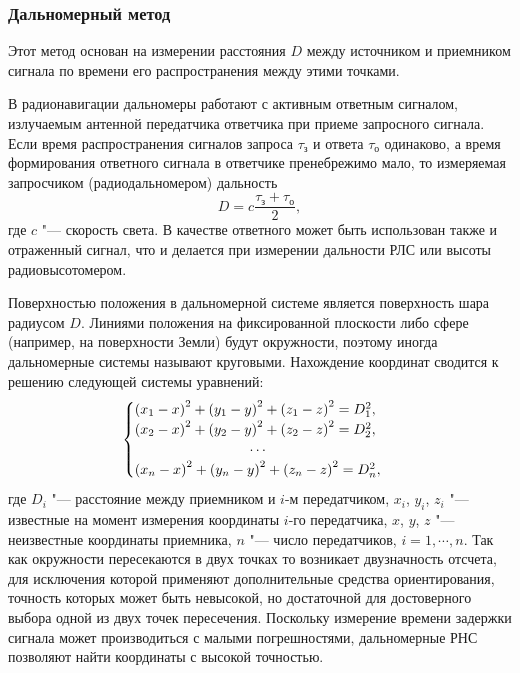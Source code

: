 \documentclass[../main.tex]{subfiles}
\begin{document}
\subsubsection{Дальномерный метод}
Этот метод основан на измерении расстояния $D$ между источником и приемником сигнала по времени его распространения между этими точками.

В радионавигации дальномеры работают с активным ответным сигналом, излучаемым антенной передатчика ответчика при приеме запросного сигнала. Если время распространения сигналов запроса $\tau_{\text{з}}$ и ответа $\tau_{\text{о}}$ одинаково, а время формирования ответного сигнала в ответчике пренебрежимо мало, то измеряемая запросчиком (радиодальномером) дальность
\begin{equation*}
    D = c \frac{\tau_{\text{з}} + \tau_{\text{о}}}{2},
\end{equation*}
где $c$ "--- скорость света. В качестве ответного может быть использован также и отраженный сигнал, что и делается при измерении дальности РЛС или высоты радиовысотомером.

Поверхностью положения в дальномерной системе является поверхность шара радиусом $D$. Линиями положения на фиксированной плоскости либо сфере (например, на поверхности Земли) будут окружности, поэтому иногда дальномерные системы называют круговыми. Нахождение координат сводится к решению следующей системы уравнений:
\begin{equation*}
    \begin{cases}
        \left(x_1 - x\right)^2 + \left(y_1 - y\right)^2 + \left(z_1 - z\right)^2 = D_1^2, \\
        \left(x_2 - x\right)^2 + \left(y_2 - y\right)^2 + \left(z_2 - z\right)^2 = D_2^2, \\
        \hfil \cdots \\
        \left(x_n - x\right)^2 + \left(y_n - y\right)^2 + \left(z_n - z\right)^2 = D_n^2, \\
    \end{cases}
\end{equation*}
где $D_i$ "--- расстояние между приемником и $i$-м передатчиком, $x_i$, $y_i$, $z_i$ "--- известные на момент измерения координаты $i$-го передатчика, $x$, $y$, $z$ "--- неизвестные координаты приемника, $n$ "--- число передатчиков, $i = 1,\cdots, n$. Так как окружности пересекаются в двух точках то возникает двузначность отсчета, для исключения которой применяют дополнительные средства ориентирования, точность которых может быть невысокой, но достаточной для достоверного выбора одной из двух точек пересечения. Поскольку измерение времени задержки сигнала может производиться с малыми погрешностями, дальномерные РНС позволяют найти координаты с высокой точностью.
\end{document}
